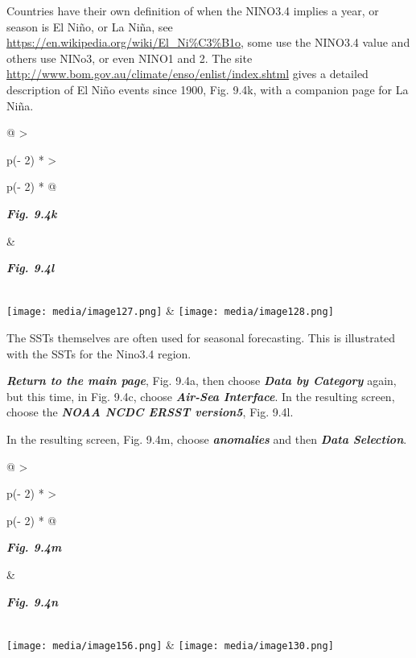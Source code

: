 \documentclass[
  letterpaper,
  DIV=11,
  numbers=noendperiod]{scrreprt}
\begin{document}
Countries have their own definition of when the NINO3.4 implies a year,
or season is El Niño, or La Niña, see
\href{https://en.wikipedia.org/wiki/El_Ni\%C3\%B1o}{\ul{https://en.wikipedia.org/wiki/El\_Ni\%C3\%B1o}},
some use the NINO3.4 value and others use NINo3, or even NINO1 and 2.
The site
\href{http://www.bom.gov.au/climate/enso/enlist/index.shtml}{\ul{http://www.bom.gov.au/climate/enso/enlist/index.shtml}}
gives a detailed description of El Niño events since 1900, Fig. 9.4k,
with a companion page for La Niña.

\begin{longtable}[]{@{}
  >{\raggedright\arraybackslash}p{(\columnwidth - 2\tabcolsep) * }
  >{\raggedright\arraybackslash}p{(\columnwidth - 2\tabcolsep) * }@{}}
\toprule\noalign{}
\begin{minipage}[b]{\linewidth}\raggedright
\textbf{\emph{Fig. 9.4k}}
\end{minipage} & \begin{minipage}[b]{\linewidth}\raggedright
\textbf{\emph{Fig. 9.4l}}
\end{minipage} \\
\midrule\noalign{}
\endhead
\bottomrule\noalign{}
\endlastfoot
\texttt{[image: media/image127.png]} &
\texttt{[image: media/image128.png]} \\
\end{longtable}

The SSTs themselves are often used for seasonal forecasting. This is
illustrated with the SSTs for the Nino3.4 region.

\textbf{\emph{Return to the main page}}, Fig. 9.4a, then choose
\textbf{\emph{Data by Category}} again, but this time, in Fig. 9.4c,
choose \textbf{\emph{Air-Sea Interface}}. In the resulting screen,
choose the \textbf{\emph{NOAA NCDC ERSST version5}}, Fig. 9.4l.

In the resulting screen, Fig. 9.4m, choose \textbf{\emph{anomalies}} and
then \textbf{\emph{Data Selection}}.

\begin{longtable}[]{@{}
  >{\raggedright\arraybackslash}p{(\columnwidth - 2\tabcolsep) * }
  >{\raggedright\arraybackslash}p{(\columnwidth - 2\tabcolsep) * }@{}}
\toprule\noalign{}
\begin{minipage}[b]{\linewidth}\raggedright
\textbf{\emph{Fig. 9.4m}}
\end{minipage} & \begin{minipage}[b]{\linewidth}\raggedright
\textbf{\emph{Fig. 9.4n}}
\end{minipage} \\
\midrule\noalign{}
\endhead
\bottomrule\noalign{}
\endlastfoot
\texttt{[image: media/image156.png]} &
\texttt{[image: media/image130.png]} \\
\end{longtable}
\end{document}
